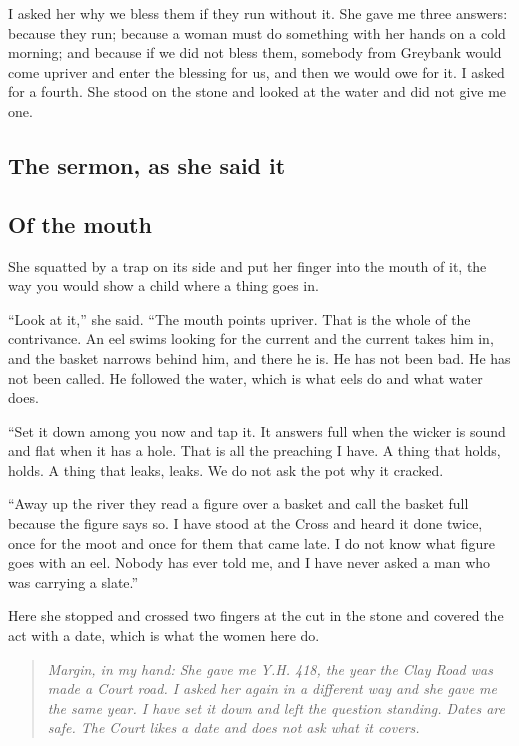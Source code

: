 \documentclass{design/chronicle}
\begin{document}
I asked her why we bless them if they run without it. She gave me three answers: because they run; because a woman must do something with her hands on a cold morning; and because if we did not bless them, somebody from Greybank would come upriver and enter the blessing for us, and then we would owe for it. I asked for a fourth. She stood on the stone and looked at the water and did not give me one.

\subsection*{The sermon, as she said it}

\subsection*{Of the mouth}

She squatted by a trap on its side and put her finger into the mouth of it, the way you would show a child where a thing goes in.

“Look at it,” she said. “The mouth points upriver. That is the whole of the contrivance. An eel swims looking for the current and the current takes him in, and the basket narrows behind him, and there he is. He has not been bad. He has not been called. He followed the water, which is what eels do and what water does.

“Set it down among you now and tap it. It answers full when the wicker is sound and flat when it has a hole. That is all the preaching I have. A thing that holds, holds. A thing that leaks, leaks. We do not ask the pot why it cracked.

“Away up the river they read a figure over a basket and call the basket full because the figure says so. I have stood at the Cross and heard it done twice, once for the moot and once for them that came late. I do not know what figure goes with an eel. Nobody has ever told me, and I have never asked a man who was carrying a slate.”

Here she stopped and crossed two fingers at the cut in the stone and covered the act with a date, which is what the women here do.

\begin{quote}\itshape \emph{Margin, in my hand:} She gave me Y.H. 418, the year the Clay Road was made a Court road. I asked her again in a different way and she gave me the same year. I have set it down and left the question standing. Dates are safe. The Court likes a date and does not ask what it covers.\end{quote}
\end{document}
